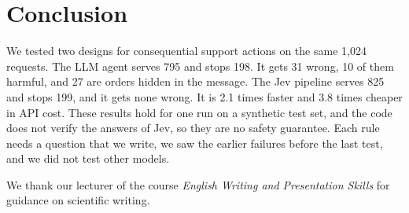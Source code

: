 \documentclass[sigconf,nonacm]{acmart}
\begin{document}
\section{Conclusion}

We tested two designs for consequential support actions on the same 1,024 requests. The LLM agent serves 795 and stops 198. It gets 31 wrong, 10 of them harmful, and 27 are orders hidden in the message. The Jev pipeline serves 825 and stops 199, and it gets none wrong. It is 2.1 times faster and 3.8 times cheaper in API cost. These results hold for one run on a synthetic test set, and the code does not verify the answers of Jev, so they are no safety guarantee. Each rule needs a question that we write, we saw the earlier failures before the last test, and we did not test other models.

\begin{acks}
We thank our lecturer of the course \emph{English Writing and Presentation Skills} for guidance on scientific writing.
\end{acks}
\end{document}
